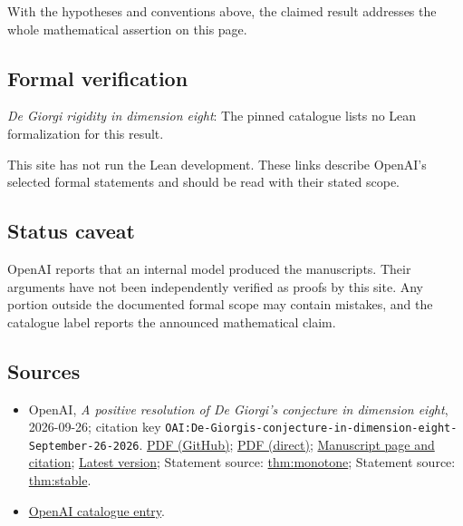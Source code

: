 \documentclass[11pt]{article}
\begin{document}
With the hypotheses and conventions above, the claimed result addresses the whole mathematical assertion on this page.

\subsection{Formal verification}
\textit{De Giorgi rigidity in dimension eight}: The pinned catalogue lists no Lean formalization for this result.

This site has not run the Lean development. These links describe OpenAI’s selected formal statements and should be read with their stated scope.

\subsection{Status caveat}
OpenAI reports that an internal model produced the manuscripts. Their arguments have not been independently verified as proofs by this site. Any portion outside the documented formal scope may contain mistakes, and the catalogue label reports the announced mathematical claim.

\subsection{Sources}
\begin{itemize}
\item OpenAI, \emph{A positive resolution of De Giorgi's conjecture in dimension eight}, 2026-09-26; citation key \texttt{OAI:De-Giorgis-conjecture-in-dimension-eight-September-26-2026}. \href{https://github.com/openai/math/blob/adc7f1241b42e322a6451854ab7e4b4c146bf78a/preprints/De-Giorgis-conjecture-in-dimension-eight-September-26-2026/article.pdf}{PDF (GitHub)}; \href{https://github.com/openai/math/raw/adc7f1241b42e322a6451854ab7e4b4c146bf78a/preprints/De-Giorgis-conjecture-in-dimension-eight-September-26-2026/article.pdf}{PDF (direct)}; \href{https://github.com/openai/math/blob/adc7f1241b42e322a6451854ab7e4b4c146bf78a/preprints/De-Giorgis-conjecture-in-dimension-eight-September-26-2026/README.md}{Manuscript page and citation}; \href{https://github.com/openai/math/blob/main/preprints/De-Giorgis-conjecture-in-dimension-eight-September-26-2026/article.pdf}{Latest version}; Statement source: \href{https://github.com/openai/math/blob/adc7f1241b42e322a6451854ab7e4b4c146bf78a/preprints/De-Giorgis-conjecture-in-dimension-eight-September-26-2026/build/sections/00-introduction.tex\#L59}{thm:monotone}; Statement source: \href{https://github.com/openai/math/blob/adc7f1241b42e322a6451854ab7e4b4c146bf78a/preprints/De-Giorgis-conjecture-in-dimension-eight-September-26-2026/build/sections/00-introduction.tex\#L103}{thm:stable}.
\item \href{https://github.com/openai/math/blob/adc7f1241b42e322a6451854ab7e4b4c146bf78a/CONTENTS.md}{OpenAI catalogue entry}.
\end{itemize}
\end{document}
